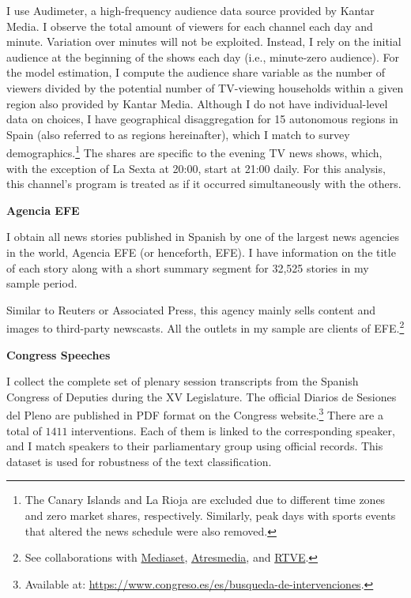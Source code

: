 \documentclass[12pt]{article}
\begin{document}
	I use Audimeter, a high-frequency audience data source provided by Kantar Media. I observe the total amount of viewers for each channel  each day and minute. Variation over minutes will not be exploited. Instead, I rely on the initial audience at the beginning of the shows each day (i.e., minute-zero audience). For the model estimation, I compute the audience share variable  as the number of viewers divided by the potential number of TV-viewing households within a given region also provided by Kantar Media. 
	Although I do not have individual-level data on choices, I have geographical disaggregation for 15 autonomous regions in Spain (also referred to as regions hereinafter), which I match to survey demographics.\footnote{The Canary Islands and La Rioja are excluded due to different time zones and zero market shares, respectively. Similarly, peak days with sports events that altered the news schedule were also removed.} The shares are specific to the evening TV news shows, which, with the exception of La Sexta at 20:00, start at 21:00 daily. For this analysis, this channel’s program is treated as if it occurred simultaneously with the others.
	
	

	
	\textbf{Agencia EFE}
	
	I obtain all news stories published in Spanish by one of the largest news agencies in the world, Agencia EFE (or henceforth, EFE). I have information on the title of each story along with a short summary segment for  32,525 stories in my sample period.
	
	Similar to Reuters or Associated Press, this agency mainly sells content and images to third-party newscasts. All the outlets in my sample are clients of  EFE.\footnote{See collaborations with \href{https://www.telecinco.es/autores/agencia-efe/}{Mediaset}, \href{https://cadenaser.com/nacional/2024/09/22/el-teletexto-una-herramienta-olvidada-que-aun-perdura-en-nuestras-televisiones-cadena-ser/}{Atresmedia}, and \href{https://www.rtve.es/rtve/20130301/rtve-agencia-efe-firman-convenio-colaboracion/611440.shtml}{RTVE}.} 


	\textbf{Congress Speeches}

 I collect the complete set of plenary session transcripts from the Spanish Congress of Deputies during the XV Legislature. The official Diarios de Sesiones del Pleno are published in PDF format on the Congress website.\footnote{Available at: \url{https://www.congreso.es/es/busqueda-de-intervenciones}.} There are a total of $1411$ interventions. Each of them is linked to the corresponding speaker, and I match speakers to their parliamentary group using official records. This dataset is used for robustness of the text classification. 
\end{document}
